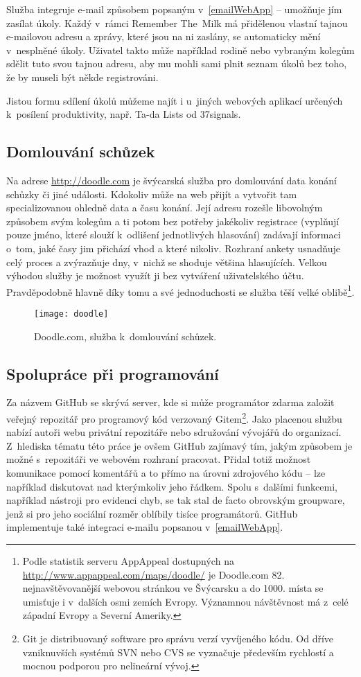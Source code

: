 \documentclass[12pt,oneside,final]{fithesis2}
\begin{document}
Služba integruje e-mail způsobem popsaným v~\ref{emailWebApp} -- umožňuje jím zasílat úkoly. Každý v~rámci Remember The~Milk má přidělenou vlastní tajnou e-mailovou adresu a zprávy, které jsou na ni zaslány, se automaticky mění v~nesplněné úkoly. Uživatel takto může například rodině nebo vybraným kolegům sdělit tuto svou tajnou adresu, aby mu mohli sami plnit seznam úkolů bez toho, že by museli být někde registrováni.

Jistou formu sdílení úkolů můžeme najít i u~jiných webových aplikací určených k~posílení produktivity, např. Ta-da Lists od 37signals.

\subsection{Domlouvání schůzek}
Na adrese \url{http://doodle.com} je švýcarská služba pro domlouvání data konání schůzky či jiné události. Kdokoliv může na web přijít a vytvořit tam specializovanou  ohledně data a času konání. Její adresu rozešle libovolným způsobem svým kolegům a ti potom bez potřeby jakékoliv registrace (vyplňují pouze jméno, které slouží k~odlišení jednotlivých hlasování) zadávají informaci o~tom, jaké časy jim přichází vhod a které nikoliv. Rozhraní ankety usnadňuje celý proces a zvýrazňuje dny, v~nichž se shoduje většina hlasujících. Velkou výhodou služby je možnost využít ji bez vytváření uživatelského účtu. Pravděpodobně hlavně díky tomu a své jednoduchosti se služba těší velké oblibě\footnote{Podle statistik serveru AppAppeal dostupných na \url{http://www.appappeal.com/maps/doodle/} je Doodle.com 82. nejnavštěvovanější webovou stránkou ve Švýcarsku a do 1000. místa se umisťuje i v~dalších osmi zemích Evropy. Významnou návštěvnost má z~celé západní Evropy a Severní Ameriky.}.

\begin{figure}[p]
    \texttt{[image: doodle]}
    \caption{Doodle.com, služba k~domlouvání schůzek.}
\end{figure}

\subsection{Spolupráce při programování}
Za názvem GitHub se skrývá server, kde si může programátor zdarma založit veřejný repozitář pro programový kód verzovaný Gitem\footnote{Git je distribuovaný software pro správu verzí vyvíjeného kódu. Od dříve vzniknuvších systémů SVN nebo CVS se vyznačuje především rychlostí a mocnou podporou pro nelineární vývoj.}. Jako placenou službu nabízí autoři webu privátní repozitáře nebo sdružování vývojářů do organizací. Z~hlediska tématu této práce je ovšem GitHub zajímavý tím, jakým způsobem je možné s~repozitáři ve webovém rozhraní pracovat. Přidal totiž možnost komunikace pomocí komentářů a to přímo na úrovni zdrojového kódu -- lze například diskutovat nad kterýmkoliv jeho řádkem. Spolu s~dalšími funkcemi, například nástroji pro evidenci chyb, se tak stal de facto obrovským groupware, jenž si pro jeho sociální rozměr oblíbily tisíce programátorů. GitHub implementuje také integraci e-mailu popsanou v~\ref{emailWebApp}.
\end{document}
